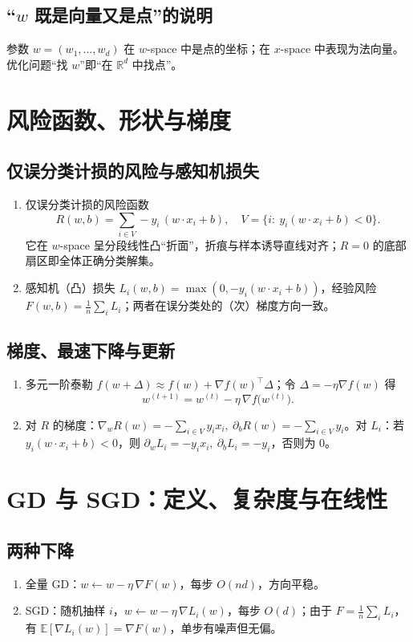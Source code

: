 \documentclass[10.5pt,hyperref,a4paper,UTF8]{ctexart}
\newcommand{\R}{\mathbb{R}}
\begin{document}
\subsection{“$w$ 既是向量又是点”的说明}
参数 $w=(w_1,\dots,w_d)$ 在 $w$-space 中是点的坐标；在 $x$-space 中表现为法向量。优化问题“找 $w$”即“在 $\R^d$ 中找点”。

\section{风险函数、形状与梯度}
\subsection{仅误分类计损的风险与感知机损失}
\begin{enumerate}
  \item 仅误分类计损的风险函数
  \[
  R(w,b)=\sum_{i\in V}-y_i\,(w\cdot x_i+b),\quad V=\{i:\ y_i(w\cdot x_i+b)<0\}.
  \]
  它在 $w$-space 呈分段线性凸“折面”，折痕与样本诱导直线对齐；$R=0$ 的底部扇区即全体正确分类解集。
  \item 感知机（凸）损失 $L_i(w,b)=\max(0,-y_i(w\cdot x_i+b))$，经验风险 $F(w,b)=\frac1n\sum_i L_i$；两者在误分类处的（次）梯度方向一致。
\end{enumerate}

\subsection{梯度、最速下降与更新}
\begin{enumerate}
  \item 多元一阶泰勒 $f(w+\Delta)\approx f(w)+\nabla f(w)^\top\Delta$；令 $\Delta=-\eta\nabla f(w)$ 得
  \[
  w^{(t+1)}=w^{(t)}-\eta\,\nabla f\big(w^{(t)}\big).
  \]
  \item 对 $R$ 的梯度：$\nabla_w R(w)=-\sum_{i\in V}y_i x_i,\ \partial_b R(w)=-\sum_{i\in V}y_i$。对 $L_i$：若 $y_i(w\cdot x_i+b)<0$，则 $\partial_w L_i=-y_i x_i,\ \partial_b L_i=-y_i$，否则为 $0$。
\end{enumerate}

\section{GD 与 SGD：定义、复杂度与在线性}
\subsection{两种下降}
\begin{enumerate}
  \item 全量 GD：$w\leftarrow w-\eta\,\nabla F(w)$，每步 $O(nd)$，方向平稳。
  \item SGD：随机抽样 $i$，$w\leftarrow w-\eta\,\nabla L_i(w)$，每步 $O(d)$；由于 $F=\frac1n\sum_i L_i$，有 $\mathbb E[\nabla L_i(w)]=\nabla F(w)$，单步有噪声但无偏。
\end{enumerate}
\end{document}
